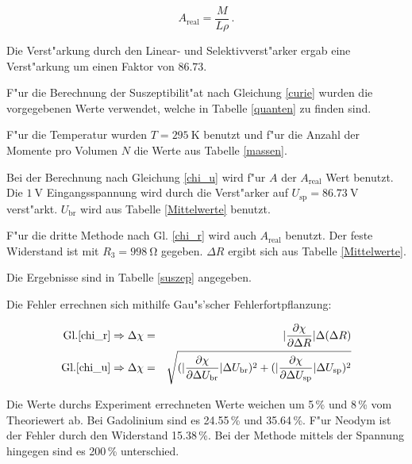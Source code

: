	\begin{equation}
		A_\mathrm{real} = \frac{M}{L \rho} \, .
	\end{equation}

	Die Verst"arkung durch den Linear- und Selektivverst"arker ergab eine Verst"arkung um einen Faktor von $86.73$.

	F"ur die Berechnung der Suszeptibilit"at nach Gleichung \eqref{curie} wurden die vorgegebenen Werte verwendet, welche in Tabelle \ref{quanten} zu finden sind.

	

	\clearpage

	F"ur die Temperatur wurden $T = \SI{295}{\kelvin}$ benutzt und f"ur die Anzahl der Momente pro Volumen $N$ die Werte aus Tabelle \ref{massen}.

	Bei der Berechnung nach Gleichung \eqref{chi_u} wird f"ur $A$ der $A_\mathrm{real}$ Wert benutzt. Die $\SI{1}{\volt}$ Eingangsspannung wird durch die Verst"arker auf $U_\mathrm{sp} = \SI{86.73}{\volt}$ verst"arkt.
	$U_\mathrm{br}$ wird aus Tabelle \ref{Mittelwerte} benutzt.

	F"ur die dritte Methode nach Gl. \eqref{chi_r} wird auch $A_\mathrm{real}$ benutzt. Der feste Widerstand ist mit $R_\mathrm{3} = \SI{998}{\ohm}$ gegeben.
	$\Delta R$ ergibt sich aus Tabelle \ref{Mittelwerte}.

	Die Ergebnisse sind in Tabelle \ref{suszep} angegeben.

	Die Fehler errechnen sich mithilfe Gau"s'scher Fehlerfortpflanzung:

	\begin{eqnarray*}
	\text{Gl.} \eqref{chi_r} \Rightarrow \Delta \chi &=& |\frac{\partial \chi}{\partial \Delta R}| \Delta (\Delta R)\\
	\text{Gl.} \eqref{chi_u} \Rightarrow \Delta \chi &=& \sqrt{(|\frac{\partial \chi}{\partial \Delta U_\mathrm{br}}| \Delta U_\mathrm{br})^2 + (|\frac{\partial \chi}{\partial \Delta U_\mathrm{sp}}| \Delta U_\mathrm{sp})^2}\\
	\end{eqnarray*}

	Die Werte durchs Experiment errechneten Werte weichen um 5\,\% und 8\,\% vom Theoriewert ab.
	Bei Gadolinium sind es 24.55\,\% und 35.64\,\%. 
	F"ur Neodym ist der Fehler durch den Widerstand 15.38\,\%. Bei der Methode mittels der Spannung hingegen sind es 200\,\% unterschied.

	
	
	
	
	
	
	

	\clearpage
